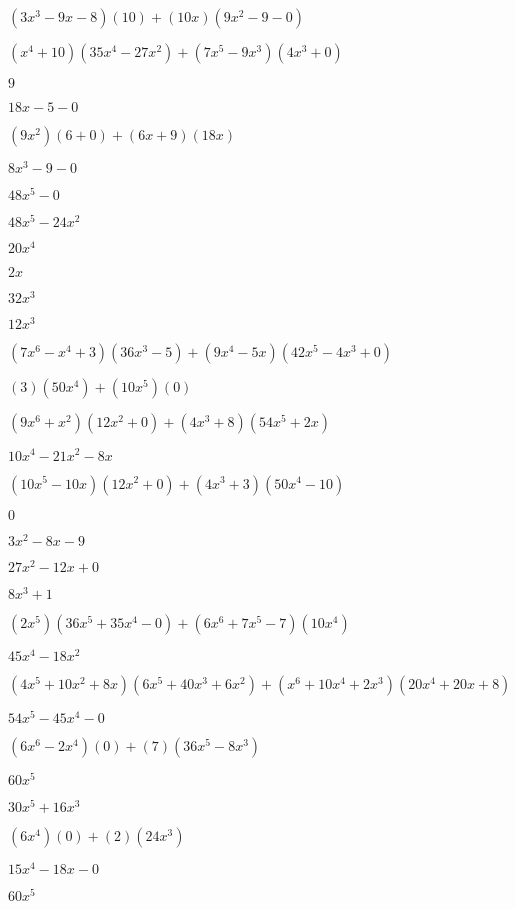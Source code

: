 \documentclass{article}
\begin{document}
\begin{multicols}{2}
$(3x^{3}-9x-8)(10)+(10x)(9x^{2}-9-0)$\item $(x^{4}+10)(35x^{4}-27x^{2})+(7x^{5}-9x^{3})(4x^{3}+0)$\item $9$\item $18x-5-0$\item $(9x^2)(6+0)+(6x+9)(18x)$\item $8x^{3}-9-0$\item $48x^{5}-0$\item $48x^{5}-24x^{2}$\item $20x^{4}$\item $2x$\item $32x^{3}$\item $12x^{3}$\item $(7x^{6}-x^{4}+3)(36x^{3}-5)+(9x^{4}-5x)(42x^{5}-4x^{3}+0)$\item $(3)(50x^{4})+(10x^{5})(0)$\item $(9x^{6}+x^2)(12x^{2}+0)+(4x^{3}+8)(54x^{5}+2x)$\item $10x^{4}-21x^{2}-8x$\item $(10x^{5}-10x)(12x^{2}+0)+(4x^{3}+3)(50x^{4}-10)$\item $0$\item $3x^{2}-8x-9$\item $27x^{2}-12x+0$\item $8x^{3}+1$\item $(2x^{5})(36x^{5}+35x^{4}-0)+(6x^{6}+7x^{5}-7)(10x^{4})$\item $45x^{4}-18x^{2}$\item $(4x^{5}+10x^2+8x)(6x^{5}+40x^{3}+6x^{2})+(x^{6}+10x^{4}+2x^{3})(20x^{4}+20x+8)$\item $54x^{5}-45x^{4}-0$\item $(6x^{6}-2x^{4})(0)+(7)(36x^{5}-8x^{3})$\item $60x^{5}$\item $30x^{5}+16x^{3}$\item $(6x^{4})(0)+(2)(24x^{3})$\item $15x^{4}-18x-0$\item $60x^{5}$\item 
\end{multicols}
\end{document}
